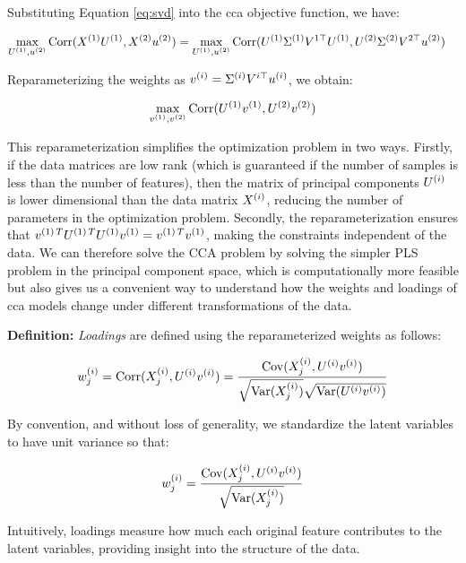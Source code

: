 Substituting Equation \ref{eq:svd} into the \acrshort{cca} objective function, we have:

\begin{align}
    \max_{U^{(1)}, u^{(2)}} \operatorname{Corr}(X^{(1)}U^{(1)}, X^{(2)}u^{(2)}) &= \max_{U^{(1)}, u^{(2)}} \operatorname{Corr}(U^{(1)}\Sigma^{(1)}V^{1\top}U^{(1)}, U^{(2)}\Sigma^{(2)}V^{2\top}u^{(2)}) \label{eq:cca_obj}
\end{align}

Reparameterizing the weights as $v^{(i)} = \Sigma^{(i)}V^{i\top}u^{(i)}$, we obtain:

\begin{align}
    \max_{v^{(1)}, v^{(2)}} \operatorname{Corr}(U^{(1)}v^{(1)}, U^{(2)}v^{(2)}) \label{eq:reparam}
\end{align}

This reparameterization simplifies the optimization problem in two ways.
Firstly, if the data matrices are low rank (which is guaranteed if the number of samples is less than the number of features), then the matrix of principal components $U^{(i)}$ is lower dimensional than the data matrix $X^{(i)}$, reducing the number of parameters in the optimization problem.
Secondly, the reparameterization ensures that $v^{(1)\,T}U^{(1)\,T}U^{(1)}v^{(1)}=v^{(1)\,T}v^{(1)}$, making the constraints independent of the data.
We can therefore solve the CCA problem by solving the simpler PLS problem in the principal component space, which is computationally more feasible but also gives us a convenient way to understand how the weights and \gls{loadings} of \acrshort{cca} models change under different transformations of the data.

\textbf{Definition:} \textit{Loadings} are defined using the reparameterized weights as follows:

\begin{align}
    w^{(i)}_j = \operatorname{Corr}(X^{(i)}_j, U^{(i)}v^{(i)}) = \frac{\mathrm{Cov}(X^{(i)}_j, U^{(i)}v^{(i)})}{\sqrt{\mathrm{Var}(X^{(i)}_j)}\sqrt{\mathrm{Var}(U^{(i)}v^{(i)})}} \label{eq:loading_def}
\end{align}

By convention, and without loss of generality, we standardize the latent variables to have unit variance so that:

\begin{align}
    w^{(i)}_j = \frac{\mathrm{Cov}(X^{(i)}_j, U^{(i)}v^{(i)})}{\sqrt{\mathrm{Var}(X^{(i)}_j)}} \label{eq:standardized_loading}
\end{align}

Intuitively, \gls{loadings} measure how much each original feature contributes to the latent variables, providing insight into the structure of the data.

